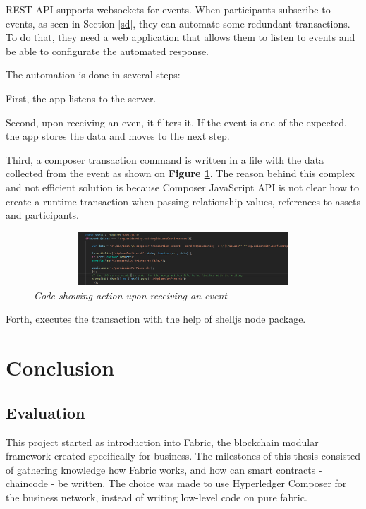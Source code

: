 \documentclass[a4paper,11pt]{report}
\begin{document}
REST API supports websockets for events. When participants subscribe to events, as seen in Section \ref{sd}, they can automate some redundant transactions. To do that, they need a web application that allows them to listen to events and be able to configurate the automated response. 

The automation is done in several steps: 

First, the app listens to the server.

Second, upon receiving an even, it filters it. If the event is one of the expected, the app stores the data and moves to the next step.

Third, a composer transaction command is written in a file with the data collected from the event as shown on \textbf{Figure \ref{confirmDiplomaWS}}. The reason behind this complex and not efficient solution is because Composer JavaScript API is not clear how to create a runtime transaction when passing relationship values, references to assets and participants. 

\begin{figure}[h]
\centering
  \includegraphics[height = 2cm ,width = 16cm]{confirmDiplomaWS.png}
  \caption{\textit{Code showing action upon receiving an event}}
  \label{confirmDiplomaWS}
\end{figure}

Forth, executes the transaction with the help of shelljs node package. 

\chapter{Conclusion}

\label{conclusion}

\section{Evaluation}

\label{conclusion-evaluation}

This project started as introduction into Fabric, the blockchain modular framework created specifically for business. The milestones of this thesis consisted of gathering knowledge how Fabric works, and how can smart contracts - chaincode - be written. The choice was made to use Hyperledger Composer for the business network, instead of writing low-level code on pure fabric.  
\end{document}
